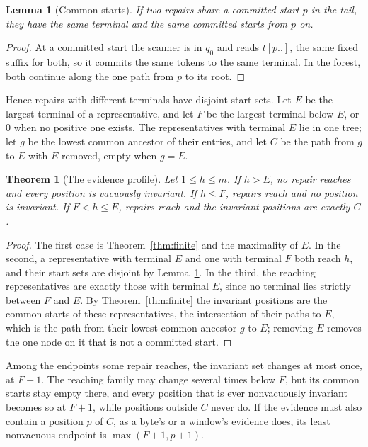 \documentclass[11pt,a4paper]{article}
\theoremstyle{definition}
\theoremstyle{plain}
\newtheorem{lemma}{Lemma}
\newtheorem{theorem}{Theorem}
\theoremstyle{remark}
\newcommand{\suffix}[2]{#1[#2..]}
\begin{document}
\begin{lemma}[Common starts]
\label{lem:common}
If two repairs share a committed start $p$ in the tail, they have the same terminal and the same committed starts from
$p$ on.
\end{lemma}

\begin{proof}
At a committed start the scanner is in $q_0$ and reads $\suffix{t}{p}$, the same fixed suffix for both, so it commits
the same tokens to the same terminal. In the forest, both continue along the one path from $p$ to its root.
\end{proof}

Hence repairs with different terminals have disjoint start sets. Let $E$ be the largest terminal of a representative,
and let $F$ be the largest terminal below $E$, or $0$ when no positive one exists. The representatives with terminal $E$
lie in one tree; let $g$ be the lowest common ancestor of their entries, and let $C$ be the path from $g$ to $E$ with
$E$ removed, empty when $g = E$.

\begin{theorem}[The evidence profile]
\label{thm:profile}
Let $1 \le h \le m$. If $h > E$, no repair reaches and every position is vacuously invariant. If $h \le F$, repairs
reach and no position is invariant. If $F < h \le E$, repairs reach and the invariant positions are exactly $C$.
\end{theorem}

\begin{proof}
The first case is Theorem~\ref{thm:finite} and the maximality of $E$. In the second, a representative with terminal $E$
and one with terminal $F$ both reach $h$, and their start sets are disjoint by Lemma~\ref{lem:common}. In the third, the
reaching representatives are exactly those with terminal $E$, since no terminal lies strictly between $F$ and $E$. By
Theorem~\ref{thm:finite} the invariant positions are the common starts of these representatives, the intersection of
their paths to $E$, which is the path from their lowest common ancestor $g$ to $E$; removing $E$ removes the one node on
it that is not a committed start.
\end{proof}

Among the endpoints some repair reaches, the invariant set changes at most once, at $F + 1$. The reaching family may
change several times below $F$, but its common starts stay empty there, and every position that is ever nonvacuously
invariant becomes so at $F + 1$, while positions outside $C$ never do. If the evidence must also contain a position $p$
of $C$, as a byte's or a window's evidence does, its least nonvacuous endpoint is $\max(F + 1, p + 1)$.
\end{document}

